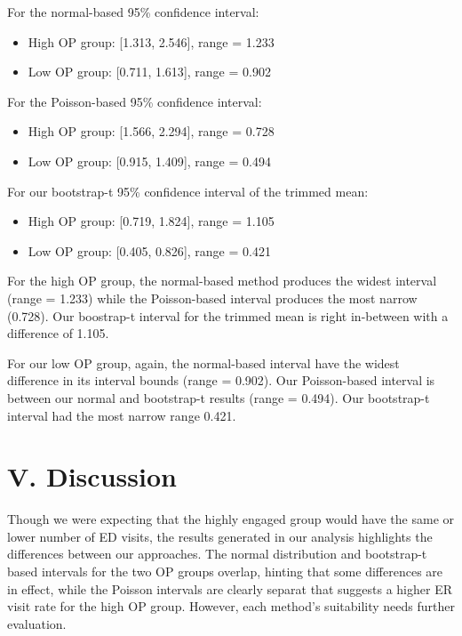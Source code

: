 \documentclass[
]{article}
\begin{document}
For the normal-based 95\% confidence interval:

\begin{itemize}
\item
  High OP group: {[}1.313, 2.546{]}, range = 1.233
\item
  Low OP group: {[}0.711, 1.613{]}, range = 0.902
\end{itemize}

For the Poisson-based 95\% confidence interval:

\begin{itemize}
\item
  High OP group: {[}1.566, 2.294{]}, range = 0.728
\item
  Low OP group: {[}0.915, 1.409{]}, range = 0.494
\end{itemize}

For our bootstrap-t 95\% confidence interval of the trimmed mean:

\begin{itemize}
\item
  High OP group: {[}0.719, 1.824{]}, range = 1.105
\item
  Low OP group: {[}0.405, 0.826{]}, range = 0.421
\end{itemize}

For the high OP group, the normal-based method produces the widest
interval (range = 1.233) while the Poisson-based interval produces the
most narrow (0.728). Our boostrap-t interval for the trimmed mean is
right in-between with a difference of 1.105.

For our low OP group, again, the normal-based interval have the widest
difference in its interval bounds (range = 0.902). Our Poisson-based
interval is between our normal and bootstrap-t results (range = 0.494).
Our bootstrap-t interval had the most narrow range 0.421.

\section{V. Discussion}\label{v.-discussion}

Though we were expecting that the highly engaged group would have the
same or lower number of ED visits, the results generated in our analysis
highlights the differences between our approaches. The normal
distribution and bootstrap-t based intervals for the two OP groups
overlap, hinting that some differences are in effect, while the Poisson
intervals are clearly separat that suggests a higher ER visit rate for
the high OP group. However, each method's suitability needs further
evaluation.
\end{document}
